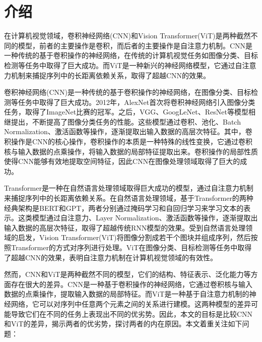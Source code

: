 \section{介绍}

在计算机视觉领域，卷积神经网络(CNN)\cite{9451544}和Vision Transformer(ViT)\cite{dosovitskiy2021image}是两种截然不同的模型，前者的主要操作是卷积，而后者的主要操作是自注意力机制。CNN是一种传统的基于卷积操作的神经网络，在传统的计算机视觉任务如图像分类、目标检测等任务中取得了巨大成功。而ViT是一种新兴的神经网络模型，它通过自注意力机制来捕捉序列中的长距离依赖关系，取得了超越CNN的效果。

卷积神经网络(CNN)是一种传统的基于卷积操作的神经网络，在图像分类、目标检测等任务中取得了巨大成功。2012年，AlexNet\cite{krizhevsky2012imagenet}首次将卷积神经网络引入图像分类任务，取得了ImageNet\cite{5206848}比赛的冠军。之后，VGG\cite{simonyan2015deep}、GoogLeNet\cite{szegedy2015going}、ResNet\cite{he2016deep}等模型相继提出，不断提高了图像分类任务的性能。这些模型通过卷积、池化、Batch Normalization、激活函数等操作，逐渐提取出输入数据的高层次特征。其中，卷积操作是CNN的核心操作，卷积操作的本质是一种特殊的线性变换，它通过卷积核与输入数据的点乘操作，将输入数据的局部特征提取出来。卷积操作的局部性质使得CNN能够有效地提取空间特征，因此CNN在图像处理领域取得了巨大的成功。

Transformer\cite{vaswani2017attention}是一种在自然语言处理领域取得巨大成功的模型，通过自注意力机制来捕捉序列中的长距离依赖关系。在自然语言处理领域，基于Transformer的两种经典架构是BERT\cite{devlin-etal-2019-bert}和GPT\cite{radford2018improving}，两者分别通过掩码学习和自回归学习来学习文本的表示。这类模型通过自注意力、Layer Normalization、激活函数等操作，逐渐提取出输入数据的高层次特征，取得了超越传统RNN模型的效果。受到自然语言处理领域的启发，Vision Transformer(ViT)将图像分割成若干个图块并组成序列，然后按照Transformer的方式对序列进行处理。ViT在图像分类、目标检测等任务中取得了超越CNN的效果，表明自注意力机制在计算机视觉领域的有效性。

然而，CNN和ViT是两种截然不同的模型，它们的结构、特征表示、泛化能力等方面存在很大的差异。CNN是一种基于卷积操作的神经网络，它通过卷积核与输入数据的点乘操作，提取输入数据的局部特征。而ViT是一种基于自注意力机制的神经网络，它可以对序列中任意两个元素之间的关系进行建模。这两种模型的差异可能导致它们在不同的任务上表现出不同的优劣势。因此，本文的目标是比较CNN和ViT的差异，揭示两者的优劣势，探讨两者的内在原因。本文着重关注如下问题：

